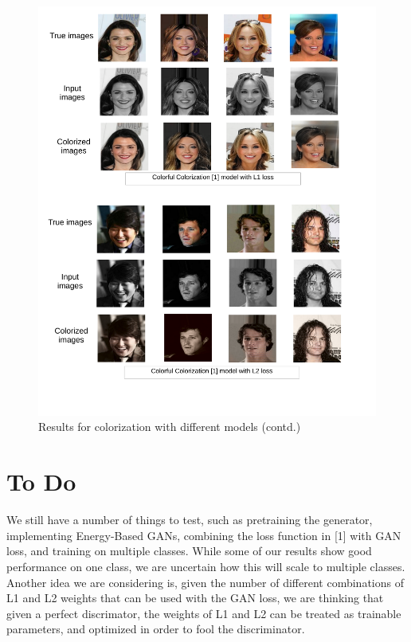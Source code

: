 \documentclass[11pt]{article}
\begin{document}
\begin{figure}[t]
\vspace{-10mm}
\hspace{-20mm}
\includegraphics [scale=0.35]{4.pdf}
\vspace{-18mm}
\caption{Results for colorization with different models (contd.)}
\label{fig:2}
\end{figure}

\newpage
\section{To Do}
We still have a number of things to test, such as pretraining the generator, implementing Energy-Based GANs,
combining the loss function in [1] with GAN loss, and training on multiple classes. While some of our results
show good performance on one class, we are uncertain how this will scale to multiple classes. Another
idea we are considering is, given the number of different combinations of L1 and L2 weights that can be
used with the GAN loss, we are thinking that given a perfect discrimator, the weights of L1 and L2 can be
treated as trainable parameters, and optimized in order to fool the discriminator.
\end{document}
